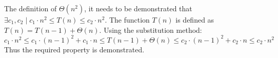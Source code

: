 The definition of $ \Theta(n^2) $, it needs to be demonstrated that $ \exists c_1, c_2 \mid c_1 \cdot n^2 \leq T(n) \leq c_2 \cdot n^2 $. The function $ T(n) $ is defined as $ T(n) = T(n-1) + \Theta(n) $. Using the substitution method:
\begin{equation*}
c_1 \cdot n^2 \leq c_1 \cdot (n-1)^2 + c_1 \cdot n \leq T(n-1) + \Theta(n) \leq c_2 \cdot (n-1)^2 + c_2 \cdot n \leq c_2 \cdot n^2
\end{equation*}
Thus the required property is demonstrated.